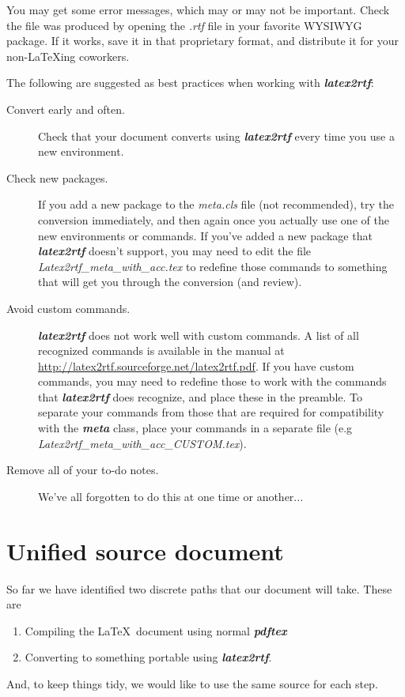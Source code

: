 \documentclass[12pt,letterpaper]{article}
\newcommand{\fn}[1]{\emph{#1}}
\newcommand{\packagename}[1]{\textbf{\emph{#1}}}
\begin{document}
You may get some error messages, which may or may not be important. Check the file was produced by opening the \fn{.rtf} file in your favorite WYSIWYG package. If it works, save it in that proprietary format, and distribute it for your non-\LaTeX ing coworkers.

The following are suggested as best practices when working with \packagename{latex2rtf}:

\begin{description}
\item[Convert early and often.] Check that your document converts using \packagename{latex2rtf} every time you use  a new environment.
\item[Check new packages.]  If you add a new package to the \fn{meta.cls} file (not recommended), try the conversion immediately, and then again once you actually use one of the new environments or commands. If you've added a new package that \packagename{latex2rtf} doesn't support, you may need to edit the file \fn{Latex2rtf\_meta\_with\_acc.tex} to redefine those commands to something that will get you through the conversion (and review).
\item[Avoid custom commands.] \packagename{latex2rtf} does not work well with custom commands. A list of all recognized commands is available in the manual at \url{http://latex2rtf.sourceforge.net/latex2rtf.pdf}. If you have custom commands, you may need to redefine those to work with the commands that \packagename{latex2rtf} does recognize, and place these in the preamble. To separate your commands from those that are required for compatibility with the \packagename{meta} class, place your commands in a separate file (e.g \fn{Latex2rtf\_meta\_with\_acc\_CUSTOM.tex}).
\item[Remove all of your to-do notes.] We've all forgotten to do this at one time or another...
\end{description}

\section{Unified source document}
So far we have identified two discrete paths that our document will take. These are 
\begin{enumerate}
\item Compiling the \LaTeX\ document using normal \packagename{pdftex}
\item Converting to something portable using \packagename{latex2rtf}. 
\end{enumerate}
And, to keep things tidy, we would like to use the same source for each step. 
\end{document}
